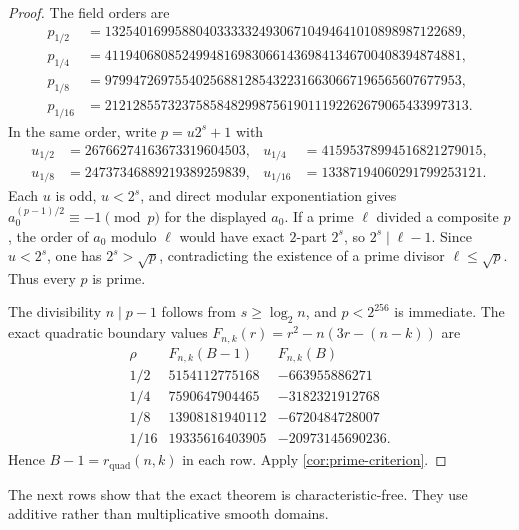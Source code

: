 \documentclass[11pt,a4paper]{amsart}
\numberwithin{equation}{section}
\theoremstyle{remark}
\begin{document}
\begin{proof}
The field orders are
\begin{align*}
 p_{1/2}&=132540169958804033333249306710494641010898987122689,\\
 p_{1/4}&=411940680852499481698306614369841346700408394874881,\\
 p_{1/8}&=979947269755402568812854322316630667196565607677953,\\
 p_{1/16}&=2121285573237585848299875619011192262679065433997313.
\end{align*}
In the same order, write $p=u2^s+1$ with
\begin{align*}
 u_{1/2}&=26766274163673319604503,&u_{1/4}&=41595378994516821279015,\\
 u_{1/8}&=24737346889219389259839,&u_{1/16}&=13387194060291799253121.
\end{align*}
Each $u$ is odd, $u<2^s$, and direct modular exponentiation gives $a_0^{(p-1)/2}\equiv-1\pmod p$ for the displayed $a_0$.  If a prime $\ell$ divided a composite $p$, the order of $a_0$ modulo $\ell$ would have exact $2$-part $2^s$, so $2^s\mid\ell-1$.  Since $u<2^s$, one has $2^s>\sqrt p$, contradicting the existence of a prime divisor $\ell\le\sqrt p$.  Thus every $p$ is prime.

The divisibility $n\mid p-1$ follows from $s\ge\log_2n$, and $p<2^{256}$ is immediate.  The exact quadratic boundary values $F_{n,k}(r)=r^2-n(3r-(n-k))$ are
\[
\begin{array}{c|r|r}
\rho&F_{n,k}(B-1)&F_{n,k}(B)\\ \hline
1/2&5154112775168&-663955886271\\
1/4&7590647904465&-3182321912768\\
1/8&13908181940112&-6720484728007\\
1/16&19335616403905&-20973145690236.
\end{array}
\]
Hence $B-1=r_{\mathrm{quad}}(n,k)$ in each row.  Apply \cref{cor:prime-criterion}.
\end{proof}

The next rows show that the exact theorem is characteristic-free.  They use additive rather than multiplicative smooth domains.
\end{document}
